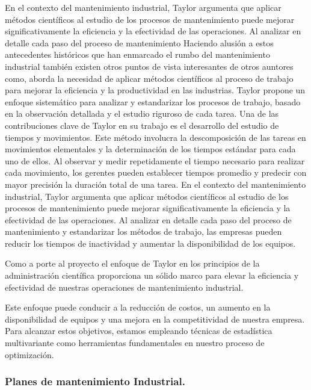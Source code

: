 \documentclass[
  11pt,
  bookmarksnumbered]{article}
\begin{document}
En el contexto del mantenimiento industrial, Taylor argumenta que aplicar métodos científicos al estudio de los procesos de mantenimiento puede mejorar significativamente la eficiencia y la efectividad de las operaciones.
Al analizar en detalle cada paso del proceso de mantenimiento Haciendo alusión a estos antecedentes históricos que han enmarcado el rumbo del mantenimiento industrial también existen otros puntos de vista interesantes de otros auntores como, \textcite{taylor1911principles} aborda la necesidad de aplicar métodos científicos al proceso de trabajo para mejorar la eficiencia y la productividad en las industrias.
Taylor propone un enfoque sistemático para analizar y estandarizar los procesos de trabajo, basado en la observación detallada y el estudio riguroso de cada tarea.
Una de las contribuciones clave de Taylor en su trabajo es el desarrollo del estudio de tiempos y movimientos.
Este método involucra la descomposición de las tareas en movimientos elementales y la determinación de los tiempos estándar para cada uno de ellos.
Al observar y medir repetidamente el tiempo necesario para realizar cada movimiento, los gerentes pueden establecer tiempos promedio y predecir con mayor precisión la duración total de una tarea.
En el contexto del mantenimiento industrial, Taylor argumenta que aplicar métodos científicos al estudio de los procesos de mantenimiento puede mejorar significativamente la eficiencia y la efectividad de las operaciones.
Al analizar en detalle cada paso del proceso de mantenimiento y estandarizar los métodos de trabajo, las empresas pueden reducir los tiempos de inactividad y aumentar la disponibilidad de los equipos.

Como a porte al proyecto el enfoque de Taylor en los principios de la administración científica proporciona un sólido marco para elevar la eficiencia y efectividad de nuestras operaciones de mantenimiento industrial.

Este enfoque puede conducir a la reducción de costos, un aumento en la disponibilidad de equipos y una mejora en la competitividad de nuestra empresa.
Para alcanzar estos objetivos, estamos empleando técnicas de estadística multivariante como herramientas fundamentales en nuestro proceso de optimización.

\hypertarget{planes-de-mantenimiento-industrial.}{%
\subsubsection{Planes de mantenimiento Industrial.}\label{planes-de-mantenimiento-industrial.}}
\end{document}
